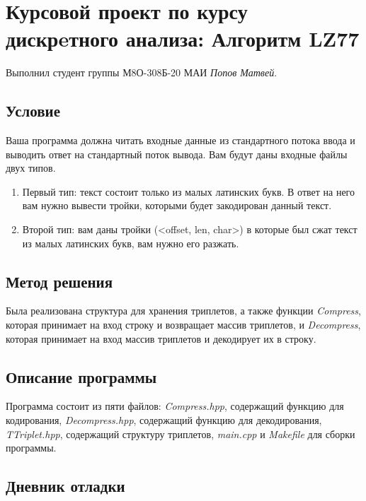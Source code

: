 \documentclass[12pt]{article}
\begin{document}
    \section*{Курсовой проект по курсу дискрeтного анализа: 
    Алгоритм LZ77}

    Выполнил студент группы М8О-308Б-20 МАИ \textit{Попов Матвей}.

    \subsection*{Условие}
    
    Ваша программа должна читать входные данные из стандартного
    потока ввода и выводить ответ на стандартный поток вывода.
    Вам будут даны входные файлы двух типов.
    
    \begin{enumerate}
    \item Первый тип: текст состоит только из малых латинских букв. В ответ на 
        него вам нужно вывести тройки, которыми будет закодирован данный текст.
    \item Второй тип: вам даны тройки (<offset, len, char>) в которые был сжат 
    текст из малых латинских букв, вам нужно его разжать.    
    \end{enumerate}

    \subsection*{Метод решения}

    Была реализована структура для хранения триплетов, а также функции 
    \textit{Compress}, которая принимает на вход строку и возвращает массив 
    триплетов, и \textit{Decompress}, которая принимает на вход массив 
    триплетов и декодирует их в строку.

    \subsection*{Описание программы}

    Программа состоит из пяти файлов: \textit{Compress.hpp}, содержащий функцию
    для кодирования, \textit{Decompress.hpp}, содержащий функцию для 
    декодирования, \textit{TTriplet.hpp}, содержащий структуру триплетов, 
    \textit{main.cpp} и \textit{Makefile} для сборки программы.

    \subsection*{Дневник отладки}
\end{document}
